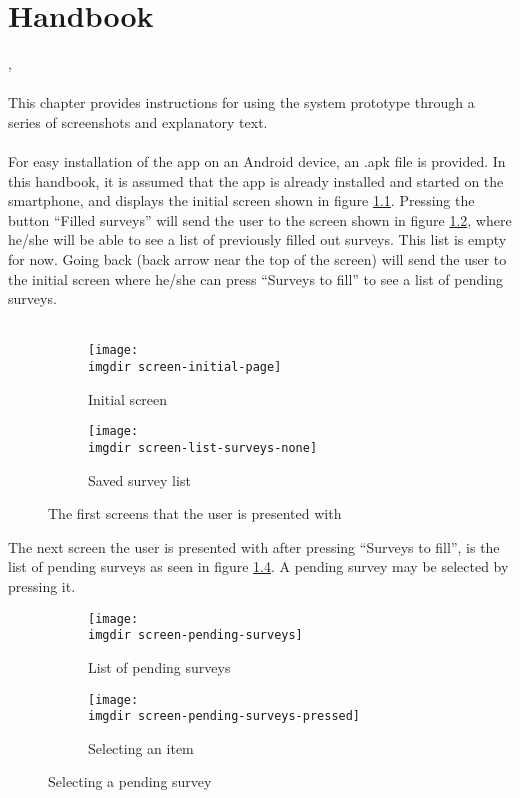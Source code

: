 \chapter{Handbook}
\label{chap:handbook}
\kim , \piotr \\\\
This chapter provides instructions for using the system prototype through a series of screenshots and explanatory text.\\\\
For easy installation of the app on an Android device, an .apk file is provided. In this handbook, it is assumed that the app is already installed and started on the smartphone, and displays the initial screen shown in figure \ref{fig:screen-initial-page}. Pressing the button ``Filled surveys'' will send the user to the screen shown in figure \ref{fig:screen-list-surveys-none}, where he/she will be able to see a list of previously filled out surveys. This list is empty for now. Going back (back arrow near the top of the screen) will send the user to the initial screen where he/she can press ``Surveys to fill'' to see a list of pending surveys.\\\\
\begin{figure}[!htbp]
 \centering

 \begin{subfigure}{.3\textwidth}
    \centering
    \texttt{[image: \\imgdir screen-initial-page]}
    \caption{Initial screen}
    \label{fig:screen-initial-page}
  \end{subfigure}
  \begin{subfigure}{.3\textwidth}
    \centering
    \texttt{[image: \\imgdir screen-list-surveys-none]}
    \caption{Saved survey list}
    \label{fig:screen-list-surveys-none}
  \end{subfigure}

  \caption{The first screens that the user is presented with}
  \label{fig:screen-initial-pages}
\end{figure}

The next screen the user is presented with after pressing ``Surveys to fill'', is the list of pending surveys as seen in figure \ref{fig:screen-pending-surveys}. A pending survey may be selected by pressing it.
\newpage

\begin{figure}[!htbp]
 \centering
 \begin{subfigure}{.3\textwidth}
    \centering
    \texttt{[image: \\imgdir screen-pending-surveys]}
    \caption{List of pending surveys}
    \label{fig:screen-pending-surveys}
  \end{subfigure}
  \begin{subfigure}{.3\textwidth}
    \centering
    \texttt{[image: \\imgdir screen-pending-surveys-pressed]}
    \caption{Selecting an item}
    \label{fig:screen-pending-surveys-pressed}
  \end{subfigure}
  \caption{Selecting a pending survey}
   \label{fig:screens-selecting-pending-survey}
\end{figure}

